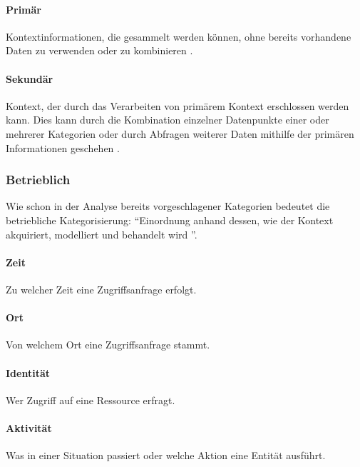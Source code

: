 \paragraph{Primär}
Kontextinformationen, die gesammelt werden können, ohne bereits vorhandene Daten zu verwenden oder zu kombinieren \cite{abowd_towards_1999}. 
\paragraph{Sekundär}
Kontext, der durch das Verarbeiten von primärem Kontext erschlossen werden kann. Dies kann durch die Kombination einzelner Datenpunkte einer oder mehrerer Kategorien oder durch Abfragen weiterer Daten mithilfe der primären Informationen geschehen \cite{abowd_towards_1999}.
\subsubsection{Betrieblich}
Wie schon in der Analyse bereits vorgeschlagener Kategorien bedeutet die betriebliche Kategorisierung: ``Einordnung anhand dessen, wie der Kontext akquiriert, modelliert und behandelt wird ''\cite{van2005context}.
\paragraph{Zeit}
Zu welcher Zeit eine Zugriffsanfrage erfolgt.
\paragraph{Ort}
Von welchem Ort eine Zugriffsanfrage stammt.
\paragraph{Identität}
Wer Zugriff auf eine Ressource erfragt.
\paragraph{Aktivität}
Was in einer Situation passiert oder welche Aktion eine Entität ausführt.
